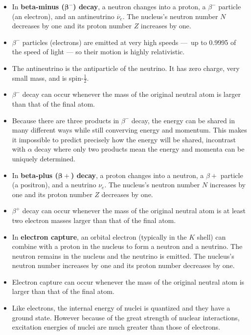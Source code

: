 \documentclass{article}
\begin{document}
\begin{itemize}
  \item In \textbf{beta-minus ($\boldsymbol{\beta}^-$) decay}, a neutron changes into a proton, a $\beta^-$ particle (an electron), and an antineutrino $\overline{\nu}_e$. The nucleus's neutron number $N$ decreases by one and its proton number $Z$ increases by one.

  \item $\beta^-$ particles (electrons) are emitted at very high speeds — up to 0.9995 of the speed of light — so their motion is highly relativistic.

  \item The antineutrino is the antiparticle of the neutrino. It has zero charge, very small mass, and is spin-$\frac{1}{2}$.

  \item $\beta^-$ decay can occur whenever the mass of the original neutral atom is larger than that of the final atom.

  \item Because there are three products in $\beta^-$ decay, the energy can be shared in many different ways while still converving energy and momentum. This makes it impossible to predict precisely how the energy will be shared, incontrast with $\alpha$ decay where only two products mean the energy and momenta can be uniquely determined.

  \item In \textbf{beta-plus ($\boldsymbol{\beta}+$) decay}, a proton changes into a neutron, a $\beta+$ particle (a positron), and a neutrino $\nu_e$. The nucleus's neutron number $N$ increases by one and its proton number $Z$ decreases by one.

  \item $\beta^+$ decay can occur whenever the mass of the original neutral atom is at least two electron masses larger than that of the final atom.

  \item In \textbf{electron capture}, an orbital electron (typically in the $K$ shell) can combine with a proton in the nucleus to form a neutron and a neutrino. The neutron remains in the nucleus and the neutrino is emitted. The nucleus's neutron number increases by one and its proton number decreases by one.

  \item Electron capture can occur whenever the mass of the original neutral atom is larger than that of the final atom.

  \item Like electrons, the internal energy of nuclei is quantized and they have a ground state. However because of the great strength of nuclear interactions, excitation energies of nuclei are much greater than those of electrons.


\end{itemize}
\end{document}

